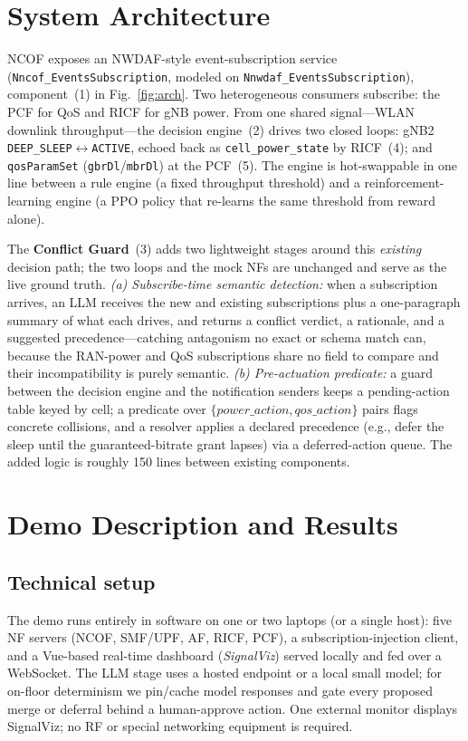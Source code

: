 \documentclass[conference]{IEEEtran}
\begin{document}
\section{System Architecture}
NCOF exposes an NWDAF-style event-subscription service
(\texttt{Nncof\_EventsSubscription}, modeled on
\texttt{Nnwdaf\_EventsSubscription}), component~(1) in Fig.~\ref{fig:arch}. Two
heterogeneous consumers subscribe: the PCF for QoS and RICF for gNB power. From
one shared signal---WLAN downlink throughput---the decision engine~(2) drives
two closed loops: gNB2 \texttt{DEEP\_SLEEP}$\leftrightarrow$\texttt{ACTIVE},
echoed back as \texttt{cell\_power\_state} by RICF~(4); and \texttt{qosParamSet}
(\texttt{gbrDl}/\texttt{mbrDl}) at the PCF~(5). The engine is hot-swappable in
one line between a rule engine (a fixed throughput threshold) and a
reinforcement-learning engine (a PPO policy that re-learns the same threshold
from reward alone).

The \textbf{Conflict Guard}~(3) adds two lightweight stages around this
\emph{existing} decision path; the two loops and the mock NFs are unchanged and
serve as the live ground truth. \emph{(a) Subscribe-time semantic detection:}
when a subscription arrives, an LLM receives the new and existing subscriptions
plus a one-paragraph summary of what each drives, and returns a conflict
verdict, a rationale, and a suggested precedence---catching antagonism no exact
or schema match can, because the RAN-power and QoS subscriptions share no field
to compare and their incompatibility is purely semantic. \emph{(b) Pre-actuation
predicate:} a guard between the decision engine and the notification senders
keeps a pending-action table keyed by cell; a predicate over
$\{\textit{power\_action}, \textit{qos\_action}\}$ pairs flags concrete
collisions, and a resolver applies a declared precedence (e.g., defer the sleep
until the guaranteed-bitrate grant lapses) via a deferred-action queue. The
added logic is roughly 150 lines between existing components.

\section{Demo Description and Results}
\subsection{Technical setup}
The demo runs entirely in software on one or two laptops (or a single host):
five NF servers (NCOF, SMF/UPF, AF, RICF, PCF), a subscription-injection
client, and a Vue-based real-time dashboard (\emph{SignalViz}) served locally
and fed over a WebSocket. The LLM stage uses a hosted endpoint or a local small
model; for on-floor determinism we pin/cache model responses and gate every
proposed merge or deferral behind a human-approve action. One external monitor
displays SignalViz; no RF or special networking equipment is required.
\end{document}

